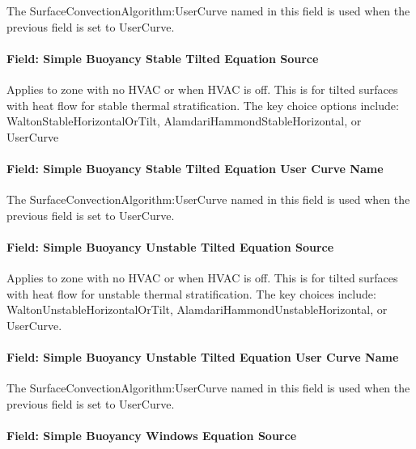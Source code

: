 The SurfaceConvectionAlgorithm:UserCurve named in this field is used when the previous field is set to UserCurve.

\paragraph{Field: Simple Buoyancy Stable Tilted Equation Source}\label{field-simple-buoyancy-stable-tilted-equation-source}

Applies to zone with no HVAC or when HVAC is off. This is for tilted surfaces with heat flow for stable thermal stratification. The key choice options include: WaltonStableHorizontalOrTilt, AlamdariHammondStableHorizontal, or UserCurve

\paragraph{Field: Simple Buoyancy Stable Tilted Equation User Curve Name}\label{field-simple-buoyancy-stable-tilted-equation-user-curve-name}

The SurfaceConvectionAlgorithm:UserCurve named in this field is used when the previous field is set to UserCurve.

\paragraph{Field: Simple Buoyancy Unstable Tilted Equation Source}\label{field-simple-buoyancy-unstable-tilted-equation-source}

Applies to zone with no HVAC or when HVAC is off. This is for tilted surfaces with heat flow for unstable thermal stratification. The key choices include: WaltonUnstableHorizontalOrTilt, AlamdariHammondUnstableHorizontal, or UserCurve.

\paragraph{Field: Simple Buoyancy Unstable Tilted Equation User Curve Name}\label{field-simple-buoyancy-unstable-tilted-equation-user-curve-name}

The SurfaceConvectionAlgorithm:UserCurve named in this field is used when the previous field is set to UserCurve.

\paragraph{Field: Simple Buoyancy Windows Equation Source}\label{field-simple-buoyancy-windows-equation-source}

